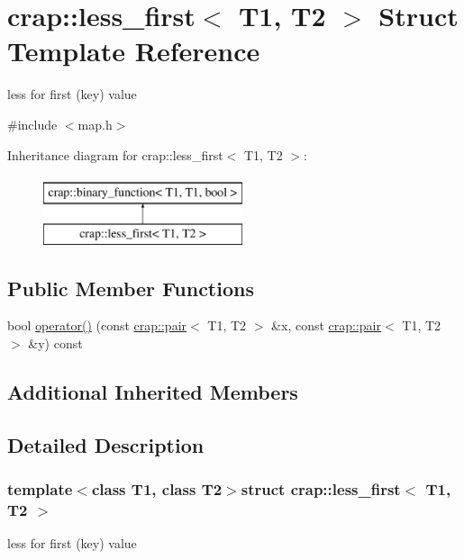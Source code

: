 \hypertarget{structcrap_1_1less__first}{\section{crap\-:\-:less\-\_\-first$<$ T1, T2 $>$ Struct Template Reference}
\label{structcrap_1_1less__first}
}


less for first (key) value  




{\ttfamily \#include $<$map.\-h$>$}

Inheritance diagram for crap\-:\-:less\-\_\-first$<$ T1, T2 $>$\-:\begin{figure}[H]
\begin{center}
\leavevmode
\includegraphics[height=2.000000cm]{structcrap_1_1less__first}
\end{center}
\end{figure}
\subsection*{Public Member Functions}
\begin{DoxyCompactItemize}
\item 
bool \hyperlink{structcrap_1_1less__first_ae98e8f89d1d10987f8c972fbc241759f}{operator()} (const \hyperlink{structcrap_1_1pair}{crap\-::pair}$<$ T1, T2 $>$ \&x, const \hyperlink{structcrap_1_1pair}{crap\-::pair}$<$ T1, T2 $>$ \&y) const 
\end{DoxyCompactItemize}
\subsection*{Additional Inherited Members}


\subsection{Detailed Description}
\subsubsection*{template$<$class T1, class T2$>$struct crap\-::less\-\_\-first$<$ T1, T2 $>$}

less for first (key) value 

